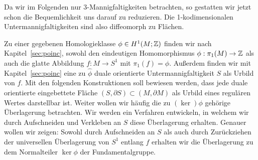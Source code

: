 Da wir im Folgenden nur 3-Mannigfaltigkeiten betrachten, so gestatten wir jetzt schon die Bequemlichkeit uns darauf zu reduzieren. Die 1-kodimensionalen Untermannigfaltigkeiten sind also diffeomorph zu Flächen.

\label{sec:constr}
Zu einer gegebenen Homologieklasse $  \phi \in H^1(M;\mathbb{Z})$ finden wir nach Kapitel~\ref{sec:poinc}, sowohl den eindeutigen Homomorphismus $\phi:\pi_1(M) \to \mathbb{Z}$ als auch die glatte Abbildung $f:M \to S^1$ mit $\pi_1(f)=\phi$. Außerdem finden wir mit Kapitel~\ref{sec:poinc} eine zu $\hat \phi$ duale orientierte Untermannigfaltigkeit $S$ als Urbild von $f$. Mit den folgenden Konstruktionen soll bewiesen werden, dass jede duale orientierte eingebettete Fläche $(S,\partial S) \subset (M,\partial M)$ als Urbild eines regulären Wertes darstellbar ist. Weiter wollen wir häufig die zu $(\ker) \phi$ gehörige Überlagerung betrachten. Wir werden ein Verfahren entwickeln, in welchem wir durch Aufschneiden und Verkleben an $S$ diese Überlagerung erhalten. Genauer wollen wir zeigen: Sowohl durch Aufschneiden an $S$ als auch durch Zurückziehen der universellen Überlagerung von $S^1$ entlang $f$ erhalten wir die Überlagerung zu dem Normalteiler $\ker\phi$ der Fundamentalgruppe.

